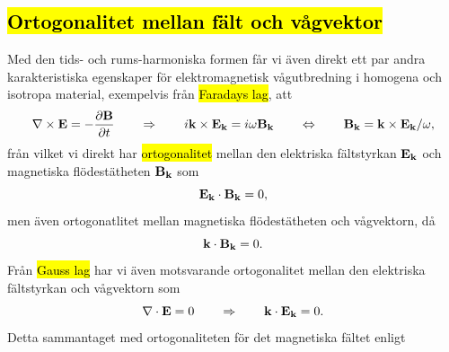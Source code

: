 \subsection{{\hl{Ortogonalitet mellan f{\"a}lt och v{\aa}gvektor}}}
Med den tids- och rums-harmoniska formen f{\aa}r vi {\"a}ven direkt ett par
andra karakteristiska egenskaper f{\"o}r elektromagnetisk v{\aa}gutbredning i
homogena och isotropa material, exempelvis fr{\aa}n {\hl{Faradays lag}}, att
\hl{$$
  \nabla\times{\bf E}=-{{\partial{\bf B}}\over{\partial t}}
  \qquad\Rightarrow\qquad
  i{\bf k}\times{\bf E}_{\bf k} = i\omega{\bf B}_{\bf k}
  \qquad\Leftrightarrow\qquad
  {\bf B}_{\bf k}={\bf k}\times{\bf E}_{\bf k}/\omega,
$$}
fr{\aa}n vilket vi direkt har {\hl{ortogonalitet}} mellan den elektriska
f{\"a}ltstyrkan ${\bf E}_{\bf k}$ och magnetiska fl{\"o}des\-t{\"a}t\-heten
${\bf B}_{\bf k}$ som
\hl{$$
  {\bf E}_{\bf k}\cdot{\bf B}_{\bf k}=0,
$$}
men {\"a}ven ortogonatlitet mellan magnetiska fl{\"o}dest{\"a}theten och
v{\aa}gvektorn, d{\aa}
\hl{$$
  {\bf k}\cdot{\bf B}_{\bf k}=0.
$$}
Fr{\aa}n {\hl{Gauss lag}}
har vi {\"a}ven motsvarande ortogonalitet mellan den elektriska f{\"a}ltstyrkan
och v{\aa}gvektorn som
\hl{$$
  \nabla\cdot{\bf E}=0
  \qquad\Rightarrow\qquad
  {\bf k}\cdot{\bf E}_{\bf k}=0.
$$}
Detta sammantaget med ortogonaliteten f{\"o}r det magnetiska f{\"a}ltet enligt
